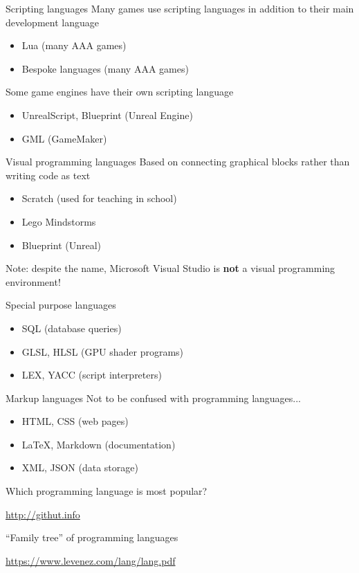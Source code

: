 \begin{frame}{Scripting languages}
	\pause Many games use scripting languages in addition to their main development language
	\begin{itemize}
		\pause\item Lua (many AAA games)
		\pause\item Bespoke languages (many AAA games)
	\end{itemize}
	\pause Some game engines have their own scripting language
	\begin{itemize}
		\pause\item UnrealScript, Blueprint (Unreal Engine)
		\pause\item GML (GameMaker)
	\end{itemize}
\end{frame}

\begin{frame}{Visual programming languages}
	\pause Based on connecting graphical blocks rather than writing code as text
	\begin{itemize}
		\pause\item Scratch (used for teaching in school)
		\pause\item Lego Mindstorms
		\pause\item Blueprint (Unreal)
	\end{itemize}
	\pause Note: despite the name, Microsoft Visual Studio is \textbf{not}
		a visual programming environment!
\end{frame}

\begin{frame}{Special purpose languages}
	\begin{itemize}
		\pause\item SQL (database queries)
		\pause\item GLSL, HLSL (GPU shader programs)
		\pause\item LEX, YACC (script interpreters)
	\end{itemize}
\end{frame}

\begin{frame}{Markup languages}
	\pause Not to be confused with programming languages...
	\begin{itemize}
		\pause\item HTML, CSS (web pages)
		\pause\item LaTeX, Markdown (documentation)
		\pause\item XML, JSON (data storage)
	\end{itemize}
\end{frame}

\begin{frame}{Which programming language is most popular?}
	\begin{center}
		\url{http://githut.info}
	\end{center}
\end{frame}

\begin{frame}{``Family tree'' of programming languages}
	\begin{center}
		\url{https://www.levenez.com/lang/lang.pdf}
	\end{center}
\end{frame}
